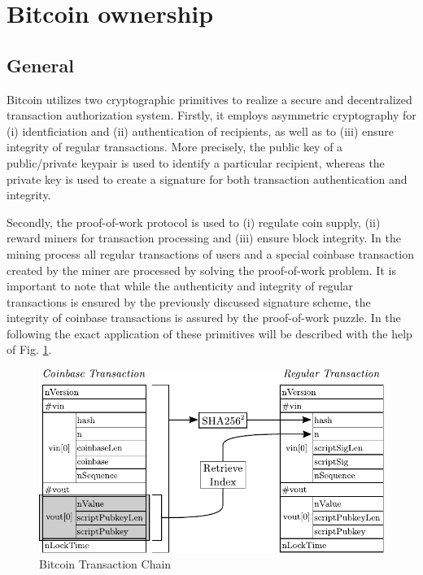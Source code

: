 \section{Bitcoin ownership} \label{sec:BitcoinOwnership}

\subsection{General} \label{sec:OwnershipGeneral}
Bitcoin utilizes two cryptographic primitives to realize a secure and decentralized transaction authorization system. Firstly, it employs asymmetric cryptography for (i) identficiation and (ii) authentication of recipients, as well as to (iii) ensure integrity of regular transactions. More precisely, the public key of a public/private keypair is used to identify a particular recipient, whereas the private key is used to create a signature for both transaction authentication and integrity.

Secondly, the proof-of-work protocol is used to (i) regulate coin supply, (ii) reward miners for transaction processing and (iii) ensure block integrity. In the mining process all regular transactions of users and a special coinbase transaction created by the miner are processed by solving the proof-of-work problem. It is important to note that while the authenticity and integrity of regular transactions is ensured by the previously discussed signature scheme, the integrity of coinbase transactions is assured by the proof-of-work puzzle. In the following the exact application of these primitives will be described with the help of Fig. \ref{fig:TransactionChain}.

\vspace{-10pt}
\begin{figure}[htbp]
\centering
\includegraphics[scale=0.9]{images/Ownership.pdf}

\caption{Bitcoin Transaction Chain}
\label{fig:TransactionChain}
\end{figure}
\vspace{-10pt}

